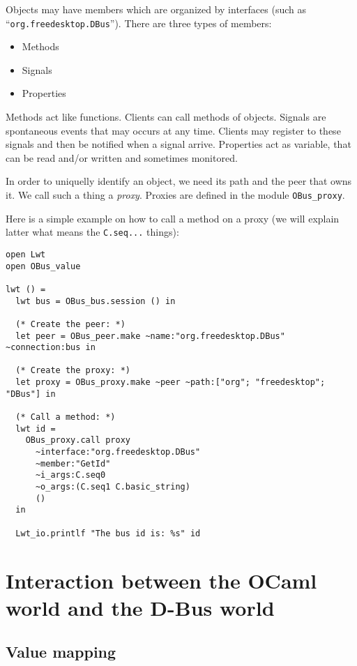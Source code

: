 \documentclass{article}
\begin{document}
Objects may have members which are organized by interfaces (such as
``\texttt{org.freedesktop.DBus}'').  There are three types of members:

\begin{itemize}
\item Methods
\item Signals
\item Properties
\end{itemize}

Methods act like functions. Clients can call methods of
objects. Signals are spontaneous events that may occurs at any
time. Clients may register to these signals and then be notified when
a signal arrive. Properties act as variable, that can be read and/or
written and sometimes monitored.

In order to uniquelly identify an object, we need its path and the
peer that owns it. We call such a thing a \emph{proxy}. Proxies are
defined in the module \texttt{OBus\_proxy}.

Here is a simple example on how to call a method on a proxy (we will
explain latter what means the \texttt{C.seq...} things):

\lstset{language=[Objective]Caml}
\begin{lstlisting}
open Lwt
open OBus_value

lwt () =
  lwt bus = OBus_bus.session () in

  (* Create the peer: *)
  let peer = OBus_peer.make ~name:"org.freedesktop.DBus" ~connection:bus in

  (* Create the proxy: *)
  let proxy = OBus_proxy.make ~peer ~path:["org"; "freedesktop"; "DBus"] in

  (* Call a method: *)
  lwt id =
    OBus_proxy.call proxy
      ~interface:"org.freedesktop.DBus"
      ~member:"GetId"
      ~i_args:C.seq0
      ~o_args:(C.seq1 C.basic_string)
      ()
  in

  Lwt_io.printlf "The bus id is: %s" id
\end{lstlisting}

\section{Interaction between the OCaml world and the D-Bus world}

\subsection{Value mapping}
\end{document}
